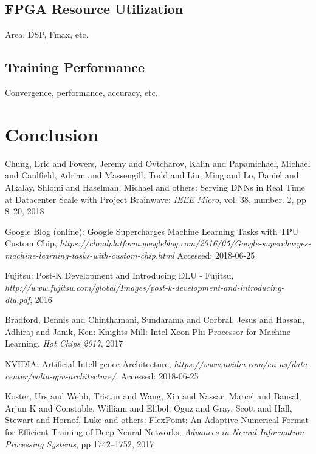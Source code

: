 \documentclass[techrep,english]{ipsj}
\begin{document}
\subsection{FPGA Resource Utilization}
Area, DSP, Fmax, etc.

\subsection{Training Performance}
Convergence, performance, accuracy, etc.

\section{Conclusion}\label{sec:conclusion}


\begin{thebibliography}{99}

  Chung, Eric and Fowers, Jeremy and Ovtcharov, Kalin and Papamichael, Michael and Caulfield, Adrian and Massengill, Todd and Liu, Ming and Lo, Daniel and Alkalay, Shlomi and Haselman, Michael and others:
  Serving DNNs in Real Time at Datacenter Scale with Project Brainwave:
  {\it IEEE Micro},
  vol. 38, number. 2, pp 8--20, 2018

  Google Blog (online):
  Google Supercharges Machine Learning Tasks with TPU Custom Chip,
  {\it https://cloudplatform.googleblog.com/2016/05/Google-supercharges-machine-learning-tasks-with-custom-chip.html}
  Accessed: 2018-06-25

  Fujitsu:
  Post-K Development and Introducing DLU - Fujitsu,
  {\it http://www.fujitsu.com/global/Images/post-k-development-and-introducing-dlu.pdf},
  2016

  Bradford, Dennis and Chinthamani, Sundarama and Corbral, Jesus and Hassan, Adhiraj and Janik, Ken:
  Knights Mill: Intel Xeon Phi Processor for Machine Learning,
  {\it Hot Chips 2017},
  2017
  
  NVIDIA:
  Artificial Intelligence Architecture,
  {\it https://www.nvidia.com/en-us/data-center/volta-gpu-architecture/},
  Accessed: 2018-06-25

  Koster, Urs and Webb, Tristan and Wang, Xin and Nassar, Marcel and Bansal, Arjun K and Constable, William and Elibol, Oguz and Gray, Scott and Hall, Stewart and Hornof, Luke and others:
  FlexPoint: An Adaptive Numerical Format for Efficient Training of Deep Neural Networks,
  {\it Advances in Neural Information Processing Systems},
  pp 1742--1752, 2017


\end{thebibliography}
\end{document}

